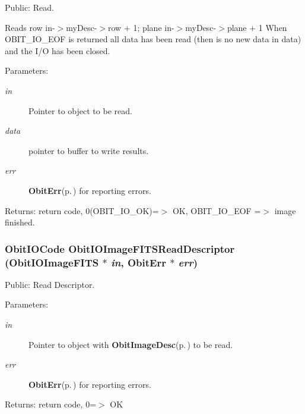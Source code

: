 Public: Read. 

Reads row in-$>$my\-Desc-$>$row + 1; plane in-$>$my\-Desc-$>$plane + 1 When OBIT\_\-IO\_\-EOF is returned all data has been read (then is no new data in data) and the I/O has been closed. \begin{Desc}
\item[Parameters:]
\begin{description}
\item[{\em in}]Pointer to object to be read. \item[{\em data}]pointer to buffer to write results. \item[{\em err}]{\bf Obit\-Err}{\rm (p.\,\pageref{structObitErr})} for reporting errors. \end{description}
\end{Desc}
\begin{Desc}
\item[Returns:]return code, 0(OBIT\_\-IO\_\-OK)=$>$ OK, OBIT\_\-IO\_\-EOF =$>$ image finished. \end{Desc}
\subsubsection{\setlength{\rightskip}{0pt plus 5cm}Obit\-IOCode Obit\-IOImage\-FITSRead\-Descriptor ({\bf Obit\-IOImage\-FITS} $\ast$ {\em in}, {\bf Obit\-Err} $\ast$ {\em err})}\label{ObitIOImageFITS_8h_a17}


Public: Read Descriptor. 

\begin{Desc}
\item[Parameters:]
\begin{description}
\item[{\em in}]Pointer to object with {\bf Obit\-Image\-Desc}{\rm (p.\,\pageref{structObitImageDesc})} to be read. \item[{\em err}]{\bf Obit\-Err}{\rm (p.\,\pageref{structObitErr})} for reporting errors. \end{description}
\end{Desc}
\begin{Desc}
\item[Returns:]return code, 0=$>$ OK \end{Desc}
